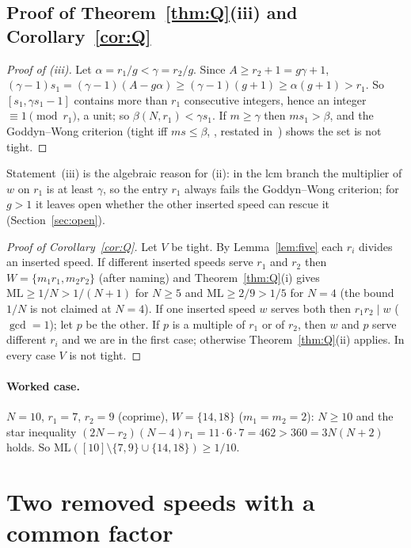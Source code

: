 \documentclass[11pt]{article}
\theoremstyle{definition}
\theoremstyle{remark}
\newcommand{\ML}{\mathrm{ML}}
\begin{document}
\subsection{Proof of Theorem~\ref{thm:Q}(iii) and Corollary~\ref{cor:Q}}
\begin{proof}[Proof of (iii)]
Let $\alpha=r_1/g<\gamma=r_2/g$. Since $A\ge r_2+1=g\gamma+1$, $(\gamma-1)s_1=(\gamma-1)(A-g\alpha)\ge(\gamma-1)(g+1)\ge\alpha(g+1)>r_1$. So $[s_1,\gamma s_1-1]$ contains more than $r_1$ consecutive integers, hence an integer $\equiv1\pmod{r_1}$, a unit; so $\beta(N,r_1)<\gamma s_1$. If $m\ge\gamma$ then $ms_1>\beta$, and the Goddyn--Wong criterion (tight iff $ms\le\beta$, \cite[Thm.~2.3]{GW}, restated in~\cite[Thm.~1.1]{Z}) shows the set is not tight.
\end{proof}
Statement~(iii) is the algebraic reason for (ii): in the lcm branch the multiplier of $w$ on $r_1$ is at least $\gamma$, so the entry $r_1$ always fails the Goddyn--Wong criterion; for $g>1$ it leaves open whether the other inserted speed can rescue it (Section~\ref{sec:open}).

\begin{proof}[Proof of Corollary~\ref{cor:Q}]
Let $V$ be tight. By Lemma~\ref{lem:five} each $r_i$ divides an inserted speed. If different inserted speeds serve $r_1$ and $r_2$ then $W=\{m_1r_1,m_2r_2\}$ (after naming) and Theorem~\ref{thm:Q}(i) gives $\ML\ge1/N>1/(N+1)$ for $N\ge5$ and $\ML\ge2/9>1/5$ for $N=4$ (the bound $1/N$ is not claimed at $N=4$). If one inserted speed $w$ serves both then $r_1r_2\mid w$ ($\gcd=1$); let $p$ be the other. If $p$ is a multiple of $r_1$ or of $r_2$, then $w$ and $p$ serve different $r_i$ and we are in the first case; otherwise Theorem~\ref{thm:Q}(ii) applies. In every case $V$ is not tight.
\end{proof}

\paragraph{Worked case.}
$N=10$, $r_1=7$, $r_2=9$ (coprime), $W=\{14,18\}$ ($m_1=m_2=2$): $N\ge10$ and the star inequality $(2N-r_2)(N-4)r_1=11\cdot6\cdot7=462>360=3N(N+2)$ holds. So $\ML([10]\setminus\{7,9\}\cup\{14,18\})\ge1/10$.



\section{Two removed speeds with a common factor}\label{sec:T}
\end{document}
